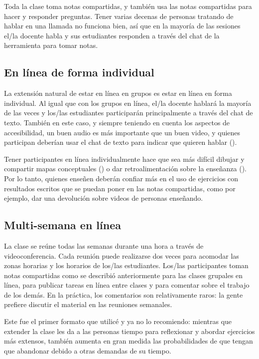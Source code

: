Toda la clase toma notas compartidas,
y también usa las notas compartidas para hacer y responder preguntas.
Tener varias decenas de personas tratando de hablar en una llamada no funciona bien,
así que en la mayoría de las sesiones
el/la docente habla y sus estudiantes responden a través del chat de la herramienta para tomar notas.

\subsection*{En línea de forma individual}

La extensión natural de estar en línea en grupos es estar en línea en forma individual.
Al igual que con los grupos en línea,
el/la docente hablará la mayoría de las veces y los/las estudiantes participarán principalmente a través del chat de texto.
También en este caso, y siempre teniendo en cuenta los aspectos de accesibilidad, un buen audio es más importante que un buen video,
y quienes participan deberían usar el chat de texto para indicar que quieren hablar ().

Tener participantes en línea individualmente hace que sea más difícil dibujar y compartir mapas conceptuales ()
o dar retroalimentación sobre la enseñanza ().
Por lo tanto, quienes enseñen deberán confiar más en el uso de ejercicios con resultados escritos que se puedan poner en las notas compartidas,
como por ejemplo, dar una devolución sobre videos de personas enseñando.

\subsection*{Multi-semana en línea}

La clase se reúne todas las semanas durante una hora a través de videoconferencia.
Cada reunión puede realizarse dos veces para acomodar las zonas horarias y los horarios de los/las estudiantes.
Los/las participantes toman notas compartidas como se describió anteriormente para las clases grupales en línea,
para publicar tareas en línea entre clases
y para comentar sobre el trabajo de los demás.
En la práctica,
los comentarios son relativamente raros:
la gente prefiere discutir el material en las reuniones semanales.

Este fue el primer formato que utilicé
y ya no lo recomiendo:
mientras que extender la clase les da a las personas tiempo para reflexionar y abordar ejercicios más extensos,
también aumenta en gran medida las probabilidades de que tengan que abandonar debido a otras demandas de su tiempo.


